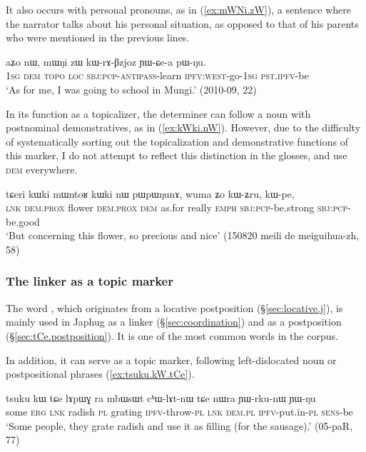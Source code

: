 It also occurs with personal pronouns, as in (\ref{ex:mWNi.zW}), a sentence where the narrator talks about his personal situation, as opposed to that of his parents who were mentioned in the previous lines.

\begin{exe}
\ex \label{ex:mWNi.zW}
\gll aʑo nɯ, mɯŋi zɯ kɯ-rɤ-βzjoz ɲɯ-ɕe-a pɯ-ŋu. \\
\textsc{1sg} \textsc{dem}  \textsc{topo} \textsc{loc} \textsc{sbj}:\textsc{pcp}-\textsc{antipass}-learn \textsc{ipfv}:\textsc{west}-go-\textsc{1sg} \textsc{pst}.\textsc{ipfv}-be \\
\glt `As for me, I was going to school in Mungi.' (2010-09, 22)
\end{exe}

In its function as a topicalizer, the determiner  can follow a noun with postnominal demonstratives, as in (\ref{ex:kWki.nW}). However, due to the difficulty of systematically sorting out the topicalization and demonstrative functions of this marker, I do not attempt to reflect this distinction in the glosses, and use  \textsc{dem} everywhere.

\begin{exe}
\ex \label{ex:kWki.nW}
\gll tɕeri kɯki mɯntoʁ kɯki nɯ pɯpɯŋunɤ, wuma ʑo kɯ-ʑru, kɯ-pe, \\
\textsc{lnk} \textsc{dem}.\textsc{prox} flower \textsc{dem}.\textsc{prox} \textsc{dem} as.for really \textsc{emph} \textsc{sbj}:\textsc{pcp}-be.strong \textsc{sbj}:\textsc{pcp}-be.good \\ 
\glt `But concerning this flower, so precious and nice' (150820 meili de meiguihua-zh, 58)
\end{exe}

\subsubsection{The linker  as a topic marker} \label{sec:tCe.topic}
The word , which originates from a locative postposition (§\ref{sec:locative.j}), is mainly used in Japhug as a linker (§\ref{sec:coordination}) and as a postposition (§\ref{sec:tCe.postposition}). It is one of the most common words in the corpus.

In addition, it can serve as a topic marker, following left-dislocated noun or postpositional phrases (\ref{ex:tsuku.kW.tCe}).

\begin{exe}
\ex \label{ex:tsuku.kW.tCe}
\gll tsuku kɯ tɕe lɤpɯɣ ra mbɯsɯt cʰɯ-lɤt-nɯ tɕe nɯra ɲɯ-rku-nɯ ɲɯ-ŋu \\
some \textsc{erg} \textsc{lnk} radish \textsc{pl} grating \textsc{ipfv}-throw-\textsc{pl} \textsc{lnk} \textsc{dem}.\textsc{pl} \textsc{ipfv}-put.in-\textsc{pl} \textsc{sens}-be \\
\glt `Some people, they grate radish and use it as filling (for the sausage).' (05-paR, 77)
\end{exe}

